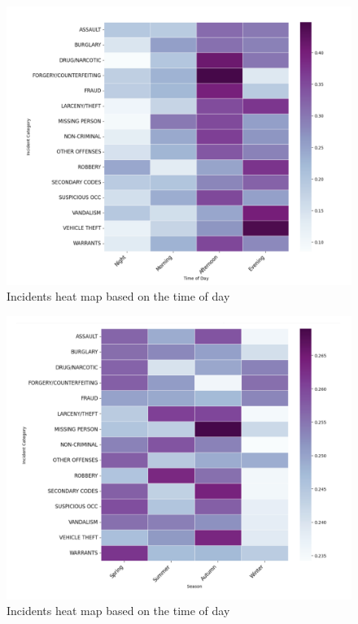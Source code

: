 \documentclass[conference,final, 10pt]{IEEEtran}
\begin{document}
\begin{figure}

{\centering \includegraphics[width=0.9\linewidth]{img/fig6} 

}

\caption{Incidents heat map based on the time of day}\label{fig:unnamed-chunk-6}
\end{figure}

\begin{figure}

{\centering \includegraphics[width=0.9\linewidth]{img/fig7} 

}

\caption{Incidents heat map based on the time of day}\label{fig:unnamed-chunk-7}
\end{figure}
\end{document}
